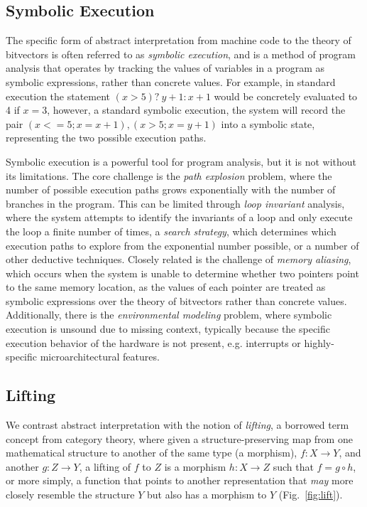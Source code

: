 \subsection{Symbolic Execution}

The specific form of abstract interpretation from machine code to the theory of bitvectors is often referred to as \emph{symbolic execution}, and is a method of program analysis that operates by tracking the values of variables in a program as symbolic expressions, rather than concrete values.
For example, in standard execution the statement $(x > 5) ?\ y + 1 : x + 1$ would be concretely evaluated to 4 if $x = 3$, however, a standard symbolic execution, the system will record the pair $(x<=5; x=x+1),(x>5;x=y+1)$ into a symbolic state, representing the two possible execution paths.

Symbolic execution is a powerful tool for program analysis, but it is not without its limitations.
The core challenge is the \emph{path explosion} problem, where the number of possible execution paths grows exponentially with the number of branches in the program.
This can be limited through \emph{loop invariant} analysis, where the system attempts to identify the invariants of a loop and only execute the loop a finite number of times, a \emph{search strategy}, which determines which execution paths to explore from the exponential number possible, or a number of other deductive techniques.
Closely related is the challenge of \emph{memory aliasing}, which occurs when the system is unable to determine whether two pointers point to the same memory location, as the values of each pointer are treated as symbolic expressions over the theory of bitvectors rather than concrete values.
Additionally, there is the \emph{environmental modeling} problem, where symbolic execution is unsound due to missing context, typically because the specific execution behavior of the hardware is not present, e.g. interrupts or highly-specific microarchitectural features.

\subsection{Lifting}

We contrast abstract interpretation with the notion of \emph{lifting}, a borrowed term concept from category theory, where given a structure-preserving map from one mathematical structure to another of the same type (a morphism), $f: X \rightarrow Y$,  and another $g: Z \rightarrow Y$, a lifting of $f$ to $Z$ is a morphism $h: X \rightarrow Z$ such that $f = g \circ h$, or more simply, a function that points to another representation that \emph{may} more closely resemble the structure $Y$ but also has a morphism to $Y$ (Fig.~\ref{fig:lift}).


